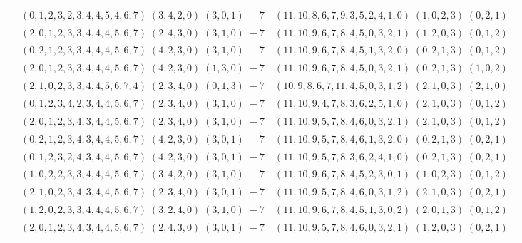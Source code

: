 \documentclass[11pt]{article}
\begin{document}
\begin{longtable}[l]{|c|c|c|}
 \cline{2-3} 
 & $(0 ,1 ,2 ,3 ,2 ,3 ,4 ,4 ,5 ,4 ,6 ,7) \;(3 ,4 ,2 ,0) \;(3 ,0 ,1) \;-7$ & $(11 ,10 ,8 ,6 ,7 ,9 ,3 ,5 ,2 ,4 ,1 ,0) \;(1 ,0 ,2 ,3) \;(0 ,2 ,1) \;$\\ 
 \cline{2-3} 
 & $(2 ,0 ,1 ,2 ,3 ,3 ,4 ,4 ,4 ,5 ,6 ,7) \;(2 ,4 ,3 ,0) \;(3 ,1 ,0) \;-7$ & $(11 ,10 ,9 ,6 ,7 ,8 ,4 ,5 ,0 ,3 ,2 ,1) \;(1 ,2 ,0 ,3) \;(0 ,1 ,2) \;$\\ 
 \cline{2-3} 
 & $(0 ,2 ,1 ,2 ,3 ,3 ,4 ,4 ,4 ,5 ,6 ,7) \;(4 ,2 ,3 ,0) \;(3 ,1 ,0) \;-7$ & $(11 ,10 ,9 ,6 ,7 ,8 ,4 ,5 ,1 ,3 ,2 ,0) \;(0 ,2 ,1 ,3) \;(0 ,1 ,2) \;$\\ 
 \cline{2-3} 
 & $(2 ,0 ,1 ,2 ,3 ,3 ,4 ,4 ,4 ,5 ,6 ,7) \;(4 ,2 ,3 ,0) \;(1 ,3 ,0) \;-7$ & $(11 ,10 ,9 ,6 ,7 ,8 ,4 ,5 ,0 ,3 ,2 ,1) \;(0 ,2 ,1 ,3) \;(1 ,0 ,2) \;$\\ 
 \cline{2-3} 
 & $(2 ,1 ,0 ,2 ,3 ,3 ,4 ,4 ,5 ,6 ,7 ,4) \;(2 ,3 ,4 ,0) \;(0 ,1 ,3) \;-7$ & $(10 ,9 ,8 ,6 ,7 ,11 ,4 ,5 ,0 ,3 ,1 ,2) \;(2 ,1 ,0 ,3) \;(2 ,1 ,0) \;$\\ 
 \cline{2-3} 
 & $(0 ,1 ,2 ,3 ,4 ,2 ,3 ,4 ,4 ,5 ,6 ,7) \;(2 ,3 ,4 ,0) \;(3 ,1 ,0) \;-7$ & $(11 ,10 ,9 ,4 ,7 ,8 ,3 ,6 ,2 ,5 ,1 ,0) \;(2 ,1 ,0 ,3) \;(0 ,1 ,2) \;$\\ 
 \cline{2-3} 
 & $(2 ,0 ,1 ,2 ,3 ,4 ,3 ,4 ,4 ,5 ,6 ,7) \;(2 ,3 ,4 ,0) \;(3 ,1 ,0) \;-7$ & $(11 ,10 ,9 ,5 ,7 ,8 ,4 ,6 ,0 ,3 ,2 ,1) \;(2 ,1 ,0 ,3) \;(0 ,1 ,2) \;$\\ 
 \cline{2-3} 
 & $(0 ,2 ,1 ,2 ,3 ,4 ,3 ,4 ,4 ,5 ,6 ,7) \;(4 ,2 ,3 ,0) \;(3 ,0 ,1) \;-7$ & $(11 ,10 ,9 ,5 ,7 ,8 ,4 ,6 ,1 ,3 ,2 ,0) \;(0 ,2 ,1 ,3) \;(0 ,2 ,1) \;$\\ 
 \cline{2-3} 
 & $(0 ,1 ,2 ,3 ,2 ,4 ,3 ,4 ,4 ,5 ,6 ,7) \;(4 ,2 ,3 ,0) \;(3 ,0 ,1) \;-7$ & $(11 ,10 ,9 ,5 ,7 ,8 ,3 ,6 ,2 ,4 ,1 ,0) \;(0 ,2 ,1 ,3) \;(0 ,2 ,1) \;$\\ 
 \cline{2-3} 
 & $(1 ,0 ,2 ,2 ,3 ,3 ,4 ,4 ,4 ,5 ,6 ,7) \;(3 ,4 ,2 ,0) \;(3 ,1 ,0) \;-7$ & $(11 ,10 ,9 ,6 ,7 ,8 ,4 ,5 ,2 ,3 ,0 ,1) \;(1 ,0 ,2 ,3) \;(0 ,1 ,2) \;$\\ 
 \cline{2-3} 
 & $(2 ,1 ,0 ,2 ,3 ,4 ,3 ,4 ,4 ,5 ,6 ,7) \;(2 ,3 ,4 ,0) \;(3 ,0 ,1) \;-7$ & $(11 ,10 ,9 ,5 ,7 ,8 ,4 ,6 ,0 ,3 ,1 ,2) \;(2 ,1 ,0 ,3) \;(0 ,2 ,1) \;$\\ 
 \cline{2-3} 
 & $(1 ,2 ,0 ,2 ,3 ,3 ,4 ,4 ,4 ,5 ,6 ,7) \;(3 ,2 ,4 ,0) \;(3 ,1 ,0) \;-7$ & $(11 ,10 ,9 ,6 ,7 ,8 ,4 ,5 ,1 ,3 ,0 ,2) \;(2 ,0 ,1 ,3) \;(0 ,1 ,2) \;$\\ 
 \cline{2-3} 
 & $(2 ,0 ,1 ,2 ,3 ,4 ,3 ,4 ,4 ,5 ,6 ,7) \;(2 ,4 ,3 ,0) \;(3 ,0 ,1) \;-7$ & $(11 ,10 ,9 ,5 ,7 ,8 ,4 ,6 ,0 ,3 ,2 ,1) \;(1 ,2 ,0 ,3) \;(0 ,2 ,1) \;$\\ 

\end{longtable}
\end{document}
